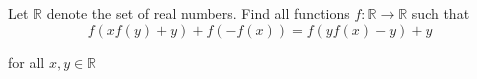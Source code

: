 Let $\mathbb{R}$ denote the set of real numbers. Find all functions $f:\mathbb{R}\rightarrow\mathbb{R}$ such that\[f(xf(y)+y)+f(-f(x))=f(yf(x)-y)+y\]

for all $x,y\in\mathbb{R}$